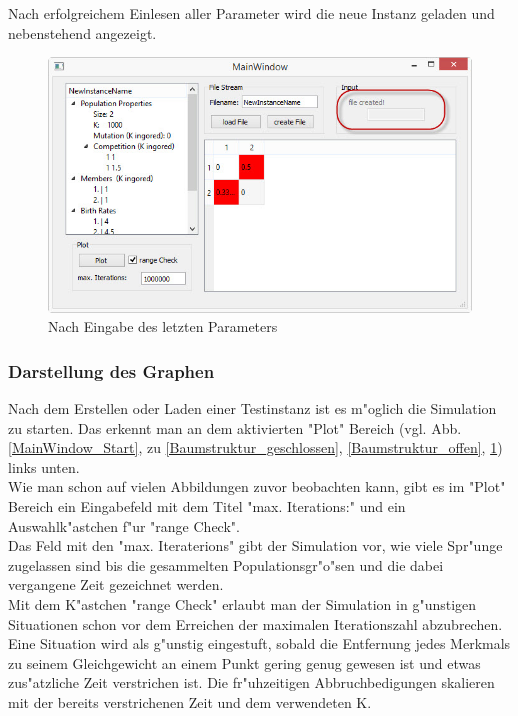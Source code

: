 \documentclass[11pt, a4paper, german]{article}
\theoremstyle{plain}
\begin{document}
	Nach erfolgreichem Einlesen aller Parameter wird die neue Instanz geladen und nebenstehend angezeigt.
	
	\begin{figure}[H]
		\centering
		\includegraphics[width=1\linewidth]{./Pictures/MainWindow_FileCreated}
		\caption[Datei erstellt]{Nach Eingabe des letzten Parameters}
		\label{fig:MainWindow_FileCreated}
	\end{figure}
	
	\subsubsection{Darstellung des Graphen}
	Nach dem Erstellen oder Laden einer Testinstanz ist es m"oglich die Simulation zu starten. Das erkennt man an dem aktivierten "{}Plot"{} Bereich (vgl. Abb. \ref{MainWindow_Start}, zu \ref{Baumstruktur_geschlossen}, \ref{Baumstruktur_offen}, \ref{fig:MainWindow_FileCreated}) links unten.\\
	Wie man schon auf vielen Abbildungen zuvor beobachten kann, gibt es im "{}Plot"{} Bereich ein Eingabefeld mit dem Titel "{}max. Iterations:"{} und ein Auswahlk"astchen f"ur "{}range Check"{}.\\
	Das Feld mit den "{}max. Iteraterions"{} gibt der Simulation vor, wie viele Spr"unge zugelassen sind bis die gesammelten Populationsgr"o"sen und die dabei vergangene Zeit gezeichnet werden. \\
	Mit dem K"astchen "{}range Check"{} erlaubt man der Simulation in g"unstigen Situationen schon vor dem Erreichen der maximalen Iterationszahl abzubrechen. Eine Situation wird als g"unstig eingestuft, sobald die Entfernung jedes Merkmals zu seinem Gleichgewicht an einem Punkt gering genug gewesen ist und etwas zus"atzliche Zeit verstrichen ist. Die fr"uhzeitigen Abbruchbedigungen skalieren mit der bereits verstrichenen Zeit und dem verwendeten K.\\
\end{document}
